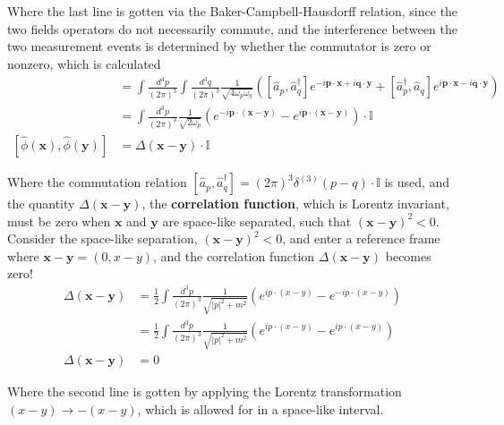 \noindent Where the last line is gotten via the Baker-Campbell-Hausdorff relation, since the two fields operators do not necessarily commute, and the interference between the two measurement events is determined by whether the commutator is zero or nonzero, which is calculated \\
\begin{align}
[ \hat{\phi}(\textbf{x}), \hat{\phi}(\textbf{y}) ] &= \int \frac{d^3 p}{(2\pi)^3} \int \frac{d^3 q}{(2\pi)^3} \frac{1}{\sqrt{4 \omega_p \omega_q}} \left( [\hat{a}_p, \hat{a}_q^\dagger ] e^{-i \textbf{p} \cdot \textbf{x} + i \textbf{q} \cdot \textbf{y}} + [\hat{a}_p^\dagger, \hat{a}_q ] e^{i \textbf{p} \cdot \textbf{x} - i \textbf{q} \cdot \textbf{y}} \right) \\
&= \int \frac{d^3 p}{(2\pi)^3} \frac{1}{\sqrt{2 \omega_p}} \left( e^{-i \textbf{p} \cdot (\textbf{x}-\textbf{y})} - e^{i \textbf{p} \cdot (\textbf{x}-\textbf{y})} \right) \cdot \mathbb{I} \\
[ \hat{\phi}(\textbf{x}), \hat{\phi}(\textbf{y}) ] &= \Delta (\textbf{x} - \textbf{y}) \cdot \mathbb{I}
\end{align}

\noindent Where the commutation relation $[\hat{a}_p, \hat{a}_q^\dagger] = (2\pi)^3 \delta^{(3)} (p-q) \cdot \mathbb{I}$ is used, and the quantity $\Delta (\textbf{x} - \textbf{y})$, the \textbf{correlation function}, which is Lorentz invariant, must be zero when $\textbf{x}$ and $\textbf{y}$ are space-like separated, such that $(\textbf{x} - \textbf{y})^2 < 0$. \\

\noindent Consider the space-like separation, $(\textbf{x} - \textbf{y})^2 < 0$, and enter a reference frame where $\textbf{x} - \textbf{y} = (0, x-y)$, and the correlation function $\Delta (\textbf{x} - \textbf{y})$ becomes zero!
\begin{align}
\Delta (\textbf{x} - \textbf{y}) &= \frac{1}{2} \int \frac{d^3 p}{(2\pi)^3} \frac{1}{\sqrt{|p|^2+m^2}} \left( e^{i p \cdot (x-y)} - e^{-ip \cdot (x-y)} \right) \\
&= \frac{1}{2} \int \frac{d^3 p}{(2\pi)^3} \frac{1}{\sqrt{|p|^2+m^2}} \left( e^{i p \cdot (x-y)} - e^{ip \cdot (x-y)} \right) \\
\Delta (\textbf{x} - \textbf{y}) &= 0
\end{align}

\noindent Where the second line is gotten by applying the Lorentz transformation $(x-y) \rightarrow -(x-y)$, which is allowed for in a space-like interval. \\

